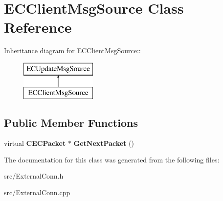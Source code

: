 \section{ECClientMsgSource Class Reference}
\label{classECClientMsgSource}
Inheritance diagram for ECClientMsgSource::\begin{figure}[H]
\begin{center}
\leavevmode
\includegraphics[height=2cm]{classECClientMsgSource}
\end{center}
\end{figure}
\subsection*{Public Member Functions}
\begin{DoxyCompactItemize}
\item 
virtual {\bf CECPacket} $\ast$ {\bfseries GetNextPacket} ()\label{classECClientMsgSource_a60cac4ec5a0de332df48bb98fcb536c4}

\end{DoxyCompactItemize}


The documentation for this class was generated from the following files:\begin{DoxyCompactItemize}
\item 
src/ExternalConn.h\item 
src/ExternalConn.cpp\end{DoxyCompactItemize}
